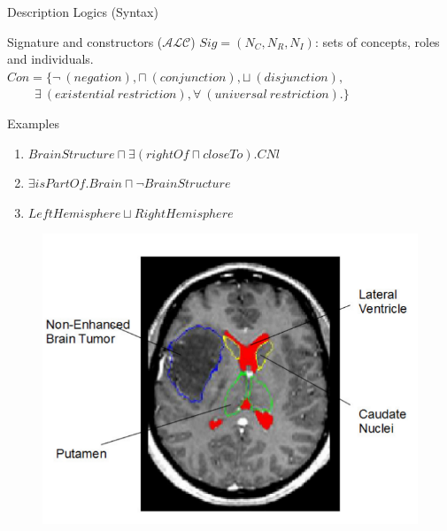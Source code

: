 \documentclass{beamer}
\begin{document}
\begin{frame}{Description Logics (Syntax)}
\begin{block}{Signature and constructors ($\mathcal{ALC}$)}
$Sig=(N_C,N_R,N_I)$: sets of concepts, roles and individuals.\\
$Con=\{\neg~(negation),\sqcap~(conjunction),\sqcup~(disjunction),$\\$~~~~~~~~~~\exists~(existential~restriction),\forall~(universal~restriction).\}$
\end{block}

\begin{exampleblock}{Examples}
\begin{enumerate}
 \item $BrainStructure \sqcap \exists (rightOf \sqcap closeTo). CNl$\\
 \item $\exists isPartOf. Brain \sqcap \neg BrainStructure$\\
 \item $LeftHemisphere\sqcup RightHemisphere$
\end{enumerate}
\end{exampleblock}
	\begin{figure}
	\includegraphics[width=.3\textwidth]{images/cerebrale.png}
	\end{figure}
\end{frame}

\end{document}
